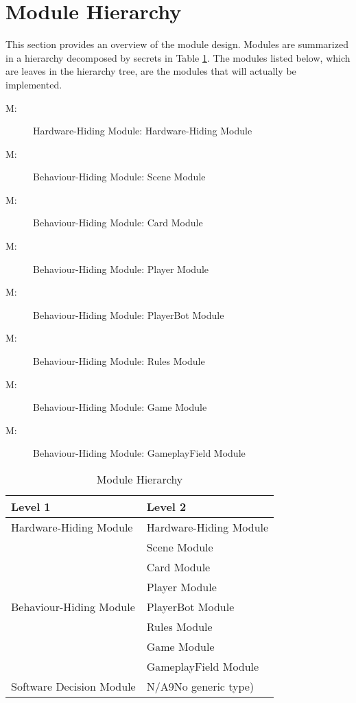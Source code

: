 \documentclass[12pt, titlepage]{article}
\newcounter{mnum}
\newcommand{\mthemnum}{M\themnum}
\begin{document}
\section{Module Hierarchy} \label{SecMH}

This section provides an overview of the module design. Modules are summarized
in a hierarchy decomposed by secrets in Table \ref{TblMH}. The modules listed
below, which are leaves in the hierarchy tree, are the modules that will
actually be implemented.

\begin{description}
\item [ \mthemnum \label{mHH}:] Hardware-Hiding Module: Hardware-Hiding Module
\item [ \mthemnum \label{mHH}:] Behaviour-Hiding Module: Scene Module
\item [ \mthemnum \label{mHH}:] Behaviour-Hiding Module:  Card Module
\item [ \mthemnum \label{mHH}:]
Behaviour-Hiding Module:  Player Module
\item [ \mthemnum \label{mHH}:] Behaviour-Hiding Module:  PlayerBot Module
\item [ \mthemnum \label{mHH}:] Behaviour-Hiding Module:  Rules Module
\item [ \mthemnum \label{mHH}:] Behaviour-Hiding Module: Game Module
\item [ \mthemnum \label{mHH}:] Behaviour-Hiding Module:  GameplayField Module

\end{description}


\begin{table}[h!]
\centering
\begin{tabular}{p{} p{}}
\toprule
\textbf{Level 1} & \textbf{Level 2}\\
\midrule

\multirow{1}{0.3\textwidth}{Hardware-Hiding Module} & Hardware-Hiding Module \\
\midrule

\multirow{7}{0.3\textwidth}{Behaviour-Hiding Module} & Scene Module\\
& Card Module\\
& Player Module\\
& PlayerBot Module\\
& Rules Module\\
& Game Module\\
& GameplayField Module\\
\midrule

\multirow{1}{0.3\textwidth}{Software Decision Module} & N/A9No generic type)\\
\bottomrule

\end{tabular}
\caption{Module Hierarchy}
\label{TblMH}
\end{table}
\end{document}
